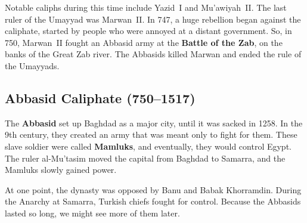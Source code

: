Notable caliphs during this time include Yazid~I and Mu'awiyah~II\@.
The last ruler of the Umayyad was Marwan~II\@.
In 747, a huge rebellion began against the caliphate, started by people who were annoyed at a distant government.
So, in 750, Marwan~II fought an Abbasid army at the \textbf{Battle of the Zab},
on the banks of the Great Zab river.
The Abbasids killed Marwan and ended the rule of the Umayyads.

\subsection*{Abbasid Caliphate (750--1517)}

The \textbf{Abbasid} set up Baghdad as a major city, until it was sacked in 1258.
In the 9th century, they created an army that was meant only to fight for them.
These slave soldier were called \textbf{Mamluks}, and eventually, they would control Egypt.
The ruler al-Mu'tasim moved the capital from Baghdad to Samarra, and the Mamluks slowly gained power.

At one point, the dynasty was opposed by Banu and Babak Khorramdin.
During the Anarchy at Samarra, Turkish chiefs fought for control.
Because the Abbasids lasted so long, we might see more of them later.
